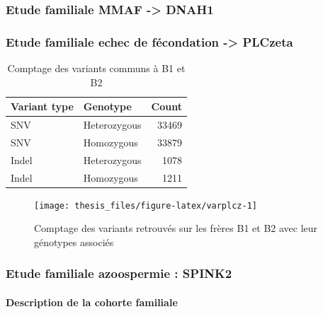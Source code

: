 \documentclass[12pt,twoside]{reedthesis}
\theoremstyle{definition}
\theoremstyle{definition}
\theoremstyle{remark}
\begin{document}
  \newpage  
  
  \hypertarget{famdnah1}{\subsubsection{Etude familiale MMAF
  -\textgreater{} DNAH1}\label{famdnah1}}
  
  \newpage  
  
  \hypertarget{plcz}{\subsubsection{Etude familiale echec de fécondation
  -\textgreater{} PLCzeta}\label{plcz}}
  
  \begin{table}
  
  \caption{\label{tab:plczetatabcommonvar}Comptage des variants communs à B1 et B2}
  \centering
  \begin{tabular}[t]{l|l|r}
  \hline
  Variant type & Genotype & Count\\
  \hline
  SNV & Heterozygous & 33469\\
  \hline
  SNV & Homozygous & 33879\\
  \hline
  Indel & Heterozygous & 1078\\
  \hline
  Indel & Homozygous & 1211\\
  \hline
  \end{tabular}
  \end{table}
  
  \begin{figure}
  
  {\centering \texttt{[image: thesis\_files/figure-latex/varplcz-1]} 
  
  }
  
  \caption[Comptage des variants retrouvés sur les frères B1 et B2 avec leur génotypes associés]{Comptage des variants retrouvés sur les frères B1 et B2 avec leur génotypes associés}\label{fig:varplcz}
  \end{figure}
  
  \newpage  
  
  \hypertarget{spink2}{\subsubsection{Etude familiale azoospermie :
  SPINK2}\label{spink2}}
  
  \paragraph{Description de la cohorte
  familiale}\label{description-de-la-cohorte-familiale}
  
\end{document}

